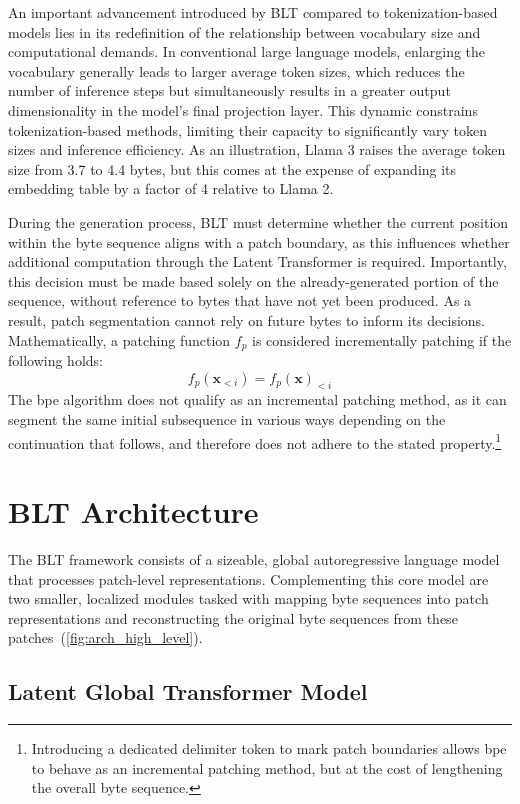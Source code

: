 An important advancement introduced by {\textsc BLT} compared to tokenization-based models lies in its redefinition of the relationship between vocabulary size and computational demands. In conventional large language models, enlarging the vocabulary generally leads to larger average token sizes, which reduces the number of inference steps but simultaneously results in a greater output dimensionality in the model's final projection layer. This dynamic constrains tokenization-based methods, limiting their capacity to significantly vary token sizes and inference efficiency. As an illustration, Llama 3 raises the average token size from 3.7 to 4.4 bytes, but this comes at the expense of expanding its embedding table by a factor of 4 relative to Llama 2.

During the generation process, {\textsc BLT} must determine whether the current position within the byte sequence aligns with a patch boundary, as this influences whether additional computation through the Latent Transformer is required. Importantly, this decision must be made based solely on the already-generated portion of the sequence, without reference to bytes that have not yet been produced. As a result, patch segmentation cannot rely on future bytes to inform its decisions. Mathematically, a patching function $f_p$ is considered incrementally patching if the following holds:
$$f_p(\pmb{x}_{<i}) = f_p(\pmb{x})_{<i}$$
The bpe algorithm does not qualify as an incremental patching method, as it can segment the same initial subsequence in various ways depending on the continuation that follows, and therefore does not adhere to the stated property.\footnote{Introducing a dedicated delimiter token to mark patch boundaries allows bpe to behave as an incremental patching method, but at the cost of lengthening the overall byte sequence.} 

\section{{\textsc BLT} Architecture}
\label{section:architecture}
The {\textsc BLT} framework consists of a sizeable, global autoregressive language model that processes patch-level representations. Complementing this core model are two smaller, localized modules tasked with mapping byte sequences into patch representations and reconstructing the original byte sequences from these patches~(\autoref{fig:arch_high_level}).

\subsection{Latent Global Transformer Model}

